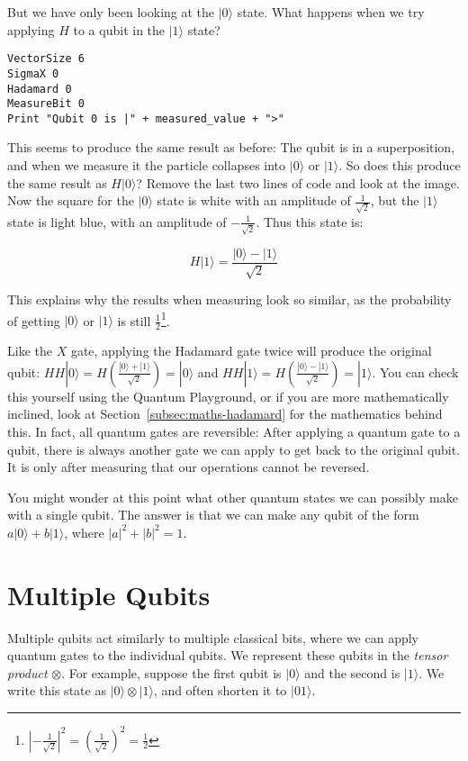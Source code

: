 \documentclass[twocolumn]{article}
\begin{document}
But we have only been looking at the $|0\rangle$ state. What happens when we try applying $H$ to a qubit in the $|1\rangle$ state?

\begin{lstlisting}
VectorSize 6
SigmaX 0
Hadamard 0
MeasureBit 0
Print "Qubit 0 is |" + measured_value + ">"
\end{lstlisting}

This seems to produce the same result as before: The qubit is in a superposition, and when we measure it the particle collapses into $|0\rangle$ or $|1\rangle$. So does this produce the same result as $H|0\rangle$? Remove the last two lines of code and look at the image. Now the square for the $|0\rangle$ state is white with an amplitude of $\frac{1}{\sqrt{2}}$, but the $|1\rangle$ state is light blue, with an amplitude of $-\frac{1}{\sqrt{2}}$. Thus this state is:

$$H|1\rangle = \frac{|0\rangle - |1\rangle}{\sqrt{2}}$$

This explains why the results when measuring look so similar, as the probability of getting $|0\rangle$ or $|1\rangle$ is still $\frac{1}{2}$\footnote{$\left|-\frac{1}{\sqrt{2}}\right|^2 = \left(\frac{1}{\sqrt{2}}\right)^2 = \frac{1}{2}$}.

Like the $X$ gate, applying the Hadamard gate twice will produce the original qubit: $HH|0\rangle = H\left(\frac{|0\rangle + |1\rangle}{\sqrt{2}}\right) = |0\rangle$ and $HH|1\rangle = H\left(\frac{|0\rangle - |1\rangle}{\sqrt{2}}\right) = |1\rangle$. You can check this yourself using the Quantum Playground, or if you are more mathematically inclined, look at Section~\ref{subsec:maths-hadamard} for the mathematics behind this. In fact, all quantum gates are reversible: After applying a quantum gate to a qubit, there is always another gate we can apply to get back to the original qubit. It is only after measuring that our operations cannot be reversed.

You might wonder at this point what other quantum states we can possibly make with a single qubit. The answer is that we can make any qubit of the form $a|0\rangle + b|1\rangle$, where $|a|^2 + |b|^2 = 1$.

\section{Multiple Qubits}

Multiple qubits act similarly to multiple classical bits, where we can apply quantum gates to the individual qubits. We represent these qubits in the {\em tensor product} $\otimes$. For example, suppose the first qubit is $|0\rangle$ and the second is $|1\rangle$. We write this state as $|0\rangle \otimes |1\rangle$, and often shorten it to $|01\rangle$.
\end{document}
